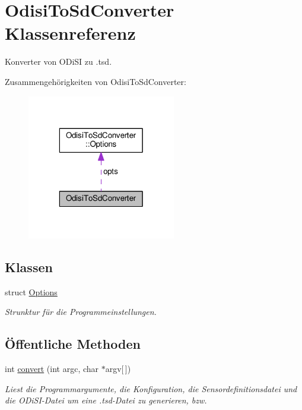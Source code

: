 \hypertarget{classOdisiToSdConverter}{\section{Odisi\-To\-Sd\-Converter Klassenreferenz}
\label{classOdisiToSdConverter}
}


Konverter von O\-Di\-S\-I zu .tsd.  




Zusammengehörigkeiten von Odisi\-To\-Sd\-Converter\-:
\nopagebreak
\begin{figure}[H]
\begin{center}
\leavevmode
\includegraphics[width=184pt]{classOdisiToSdConverter__coll__graph}
\end{center}
\end{figure}
\subsection*{Klassen}
\begin{DoxyCompactItemize}
\item 
struct \hyperlink{structOdisiToSdConverter_1_1Options}{Options}
\begin{DoxyCompactList}\small\item\em Strunktur für die Programmeinstellungen. \end{DoxyCompactList}\end{DoxyCompactItemize}
\subsection*{Öffentliche Methoden}
\begin{DoxyCompactItemize}
\item 
int \hyperlink{classOdisiToSdConverter_ab4e518bcb8d7588180bb4e1edec50c06}{convert} (int argc, char $\ast$argv\mbox{[}$\,$\mbox{]})
\begin{DoxyCompactList}\small\item\em Liest die Programmargumente, die Konfiguration, die Sensordefinitionsdatei und die O\-Di\-S\-I-\/\-Datei um eine .tsd-\/\-Datei zu generieren, bzw. \end{DoxyCompactList}\end{DoxyCompactItemize}
